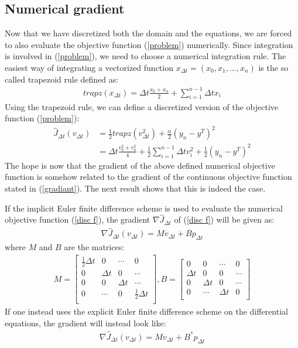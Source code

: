 \subsection{Numerical gradient}
Now that we have discretized both the domain and the equations, we are forced to also evaluate the objective function (\ref{problem}) numerically. Since integration is involved in (\ref{problem}), we need to choose a numerical integration rule. The easiest way of integrating a vectorized function $x_{\Delta t} = (x_0,x_1,...,x_n)$ is the so called trapezoid rule defined as:
\begin{align}
trapz(x_{\Delta t})=\Delta t\frac{x_0+x_n}{2} +\sum_{i=1}^{n-1} \Delta t x_i \label{trap}
\end{align}
Using the trapezoid rule, we can define a discretized version of the objective function (\ref{problem}):
\begin{align}
\hat J_{\Delta t}(v_{\Delta t})&=\frac{1}{2} trapz(v_{\Delta t}^2)+ \frac{\alpha}{2}(y_n-y^T)^2 \\
&=\Delta t\frac{v_0^2+v_n^2}{4} + \frac{1}{2}\sum_{i=1}^{n-1} \Delta t v_i^2 + \frac{1}{2}(y_n-y^T)^2 \label{disc f}
\end{align}
The hope is now that the gradient of the above defined numerical objective function is somehow related to the gradient of the continuous objective function stated in (\ref{gradiant}). The next result shows that this is indeed the case. 
\begin{theorem}
If the implicit Euler finite difference scheme is used to evaluate the numerical objective function (\ref{disc f}), the gradient $\nabla \hat J_{\Delta t}$ of (\ref{disc f}) will be given as:
\begin{align}
\nabla \hat J_{\Delta t}(v_{\Delta t}) = Mv_{\Delta t} + Bp_{\Delta t} \label{num_grad}
\end{align}
where $M$ and $B$ are the matrices:
\begin{align*}
M=\left[ \begin{array}{cccc}
   \frac{1}{2}\Delta t & 0 & \cdots & 0 \\  
   0& \Delta t & 0 & \cdots \\ 
   0 &0 & \Delta t  & \cdots \\
   0 &\cdots &0 & \frac{1}{2}\Delta t   \\
   \end{array}  \right] 
,B = \left[ \begin{array}{cccc}
   0& 0 & \cdots & 0 \\  
   \Delta t& 0 & 0 & \cdots \\ 
   0 & \Delta t& 0  & \cdots \\
   0 &\cdots & \Delta t& 0   \\
   \end{array}  \right] 
\end{align*}
If one instead uses the explicit Euler finite difference scheme on the differential equations, the gradient will instead look like:
\begin{align*}
\nabla \hat J_{\Delta t}(v_{\Delta t}) = Mv_{\Delta t} + B^*p_{\Delta t}
\end{align*}
\end{theorem}

